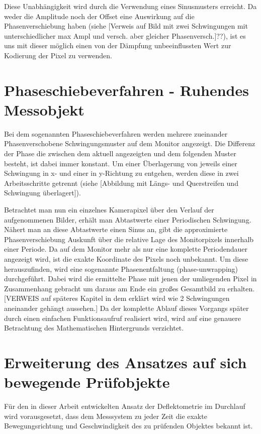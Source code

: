 Diese Unabhängigkeit wird durch die Verwendung eines Sinusmusters erreicht. Da weder die Amplitude noch der Offset eine Auswirkung auf die Phasenverschiebung haben (siehe [Verweis auf Bild mit zwei Schwingungen mit unterschiedlicher max Ampl und versch. aber gleicher Phasenversch.]??), ist es uns mit dieser möglich einen von der Dämpfung unbeeinflussten Wert zur Kodierung der Pixel zu verwenden.


\section{Phaseschiebeverfahren - Ruhendes Messobjekt}

Bei dem sogenannten Phaseschiebeverfahren werden mehrere zueinander Phasenverschobene Schwingungsmuster auf dem Monitor angezeigt. Die Differenz der Phase die zwischen dem aktuell angezeigten und dem folgenden Muster besteht, ist dabei immer konstant. Um einer Überlagerung von jeweils einer Schwingung in x- und einer in y-Richtung zu entgehen, werden diese in zwei Arbeitsschritte getrennt (siehe [Abbildung mit Längs- und Querstreifen und Schwingung überlagert]).

Betrachtet man nun ein einzelnes Kamerapixel über den Verlauf der aufgenommenen Bilder, erhält man Abtastwerte einer Periodischen Schwingung. Nähert man an diese Abtastwerte einen Sinus an, gibt die approximierte Phasenverschiebung Auskunft über die relative Lage des Monitorpixels innerhalb einer Periode. Da auf dem Monitor mehr als nur eine komplette Periodendauer angezeigt wird, ist die exakte Koordinate des Pixels noch unbekannt. Um diese herauszufinden, wird eine sogenannte Phasenentfaltung (phase-unwrapping) durchgeführt. Dabei wird die ermittelte Phase mit jenen der umliegenden Pixel in Zusammenhang gebracht um daraus am Ende ein großes Gesamtbild zu erhalten. [VERWEIS auf späteres Kapitel in dem erklärt wird wie 2 Schwingungen aneinander gehängt aussehen.] Da der komplette Ablauf dieses Vorgangs später durch einen einfachen Funktionsaufruf realisiert wird, wird auf eine genauere Betrachtung des Mathematischen Hintergrunds verzichtet.


\section{Erweiterung des Ansatzes auf sich bewegende Prüfobjekte}

Für den in dieser Arbeit entwickelten Ansatz der Deflektometrie im Durchlauf wird vorausgesetzt, dass dem Messsystem zu jeder Zeit die exakte Bewegungsrichtung und Geschwindigkeit des zu prüfenden Objektes bekannt ist.

